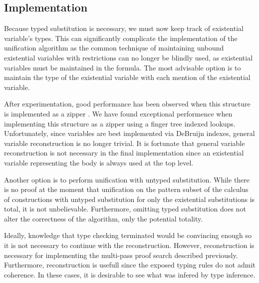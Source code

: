 \subsection{Implementation}

Because typed substitution is necessary, we must now keep track of existential variable's
types.  This can significantly complicate the implementation of the unification algorithm
as the common technique of maintaining unbound existential variables with restrictions
can no longer be blindly used, as existential variables must be maintained in the 
formula.  The most advisable option is to maintain the type of the existential variable 
with each mention of the existential variable.  

After experimentation, good performance has been observed when this structure is implemented
as a zipper \citep{huet1997functional}. We have found exceptional performence when implementing this structure
as a zipper using a finger tree indexed lookups. Unfortunately, since variables are best 
implemented via DeBruijn indexes, general variable reconstruction is no longer trivial.  It is fortunate that general variable reconstruction 
is not necessary in the final implementation since an existential variable representing the body is always used at the top level.

Another option is to perform unification with untyped substitution.
While there is no proof at the moment that unification on the pattern subset of 
the calculus of constructions with untyped substitution for only the existential substitutions
is total, it is not unbelievable. Furthermore, omitting typed substitution does not alter
the correctness of the algorithm, only the potential totality.  

Ideally, knowledge that type checking terminated would be convincing enough
so it is not necessary to continue with the reconstruction.  However, reconstruction
is necessary for implementing the multi-pass proof search described previously.  
Furthermore, reconstruction is usefull since the exposed typing rules do not admit 
coherence.  In these cases, it is desirable to see what was infered by type inference.

